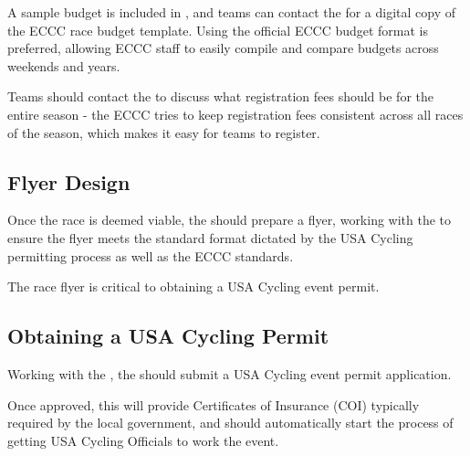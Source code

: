 A sample budget is included in , and teams can contact the 
for a digital copy of the ECCC race budget template.
Using the official ECCC budget format is preferred, allowing ECCC staff to easily compile and compare budgets across weekends and years.

Teams should contact the  to discuss what registration fees should be for the entire season -
the ECCC tries to keep registration fees consistent across all races of the season, which makes it easy for teams to register.

\subsection{Flyer Design}

Once the race is deemed viable, the  should prepare a flyer, working with the 
to ensure the flyer meets the standard format dictated by the USA Cycling permitting process as well as the ECCC standards.

The race flyer is critical to obtaining a USA Cycling event permit.

\subsection[USA Cycling Permitting]{Obtaining a USA Cycling Permit}

Working with the , the  should submit a USA Cycling event permit application.

Once approved, this will provide Certificates of Insurance (COI) %
typically required by the local government,
and should automatically start the process of getting USA Cycling Officials to work the event.
